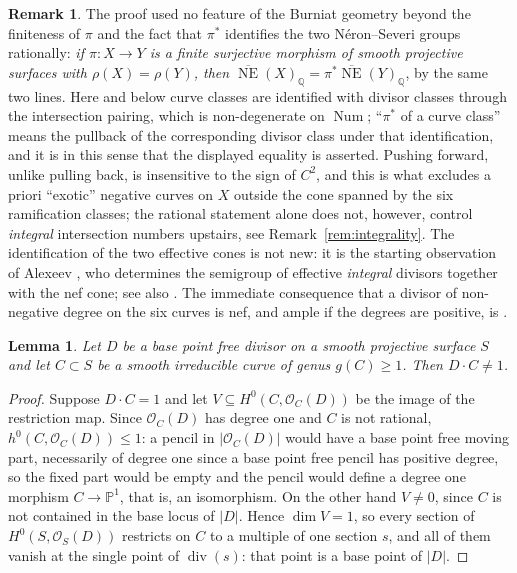 \documentclass{amsart}
\newtheorem{lemma}[theorem]{Lemma}
\theoremstyle{definition}
\newtheorem{remark}[theorem]{Remark}
\newcommand{\OO}{\mathcal{O}}
\newcommand{\PP}{\mathbb{P}}
\newcommand{\Num}{\operatorname{Num}}
\newcommand{\QQ}{\mathbb{Q}}
\newcommand{\NE}{\overline{\operatorname{NE}}}
\begin{document}
\begin{remark}\label{rem:mori-general}
The proof used no feature of the Burniat geometry beyond the finiteness of $\pi$ and the fact that $\pi^*$ identifies the two N\'eron--Severi groups rationally: \emph{if $\pi:X\to Y$ is a finite surjective morphism of smooth projective surfaces with $\rho(X)=\rho(Y)$, then $\NE(X)_\QQ=\pi^*\NE(Y)_\QQ$}, by the same two lines. Here and below curve classes are identified with divisor classes through the intersection pairing, which is non-degenerate on $\Num$; ``$\pi^*$ of a curve class'' means the pullback of the corresponding divisor class under that identification, and it is in this sense that the displayed equality is asserted. Pushing forward, unlike pulling back, is insensitive to the sign of $C^2$, and this is what excludes a priori ``exotic'' negative curves on $X$ outside the cone spanned by the six ramification classes; the rational statement alone does not, however, control \emph{integral} intersection numbers upstairs, see Remark~\ref{rem:integrality}. The identification of the two effective cones is not new: it is the starting observation of Alexeev \cite[\S4]{Ale16}, who determines the semigroup of effective \emph{integral} divisors together with the nef cone; see also \cite{AO13}. The immediate consequence that a divisor of non-negative degree on the six curves is nef, and ample if the degrees are positive, is \cite[Prop.~4.2]{Cho26}.
\end{remark}

\begin{lemma}\label{lem:bpf-degree}
Let $D$ be a base point free divisor on a smooth projective surface $S$ and let $C\subset S$ be a smooth irreducible curve of genus $g(C)\ge1$. Then $D\cdot C\neq1$.
\end{lemma}

\begin{proof}
Suppose $D\cdot C=1$ and let $V\subseteq H^0(C,\OO_C(D))$ be the image of the restriction map. Since $\OO_C(D)$ has degree one and $C$ is not rational, $h^0(C,\OO_C(D))\le1$: a pencil in $|\OO_C(D)|$ would have a base point free moving part, necessarily of degree one since a base point free pencil has positive degree, so the fixed part would be empty and the pencil would define a degree one morphism $C\to\PP^1$, that is, an isomorphism. On the other hand $V\neq0$, since $C$ is not contained in the base locus of $|D|$. Hence $\dim V=1$, so every section of $H^0(S,\OO_S(D))$ restricts on $C$ to a multiple of one section $s$, and all of them vanish at the single point of $\operatorname{div}(s)$: that point is a base point of $|D|$.
\end{proof}
\end{document}
